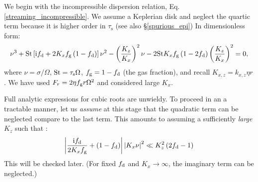 We begin with the incompressible dispersion
relation, Eq. \ref{streaming_incompressible}. We assume a Keplerian
disk and neglect the quartic  
term because it is higher order in $\tau_\mathrm{s}$ (see also
\S\ref{spurious_epi})  In dimensionless form: 
\begin{align}
  \nu^3 + \mathrm{St}\left[\mathrm{i}f_\mathrm{d} + 2 K_x f_\mathrm{g} \left(1-f_\mathrm{d}\right)\right]\nu^2
  - \left(\frac{K_z}{K_x}\right)^2\nu - 2\mathrm{St} K_x f_\mathrm{g}
  \left(1-2f_\mathrm{d}\right)\left(\frac{K_z}{K_x}\right)^2 = 0,\label{dimless_cubic}
\end{align}
where $\nu = \sigma/\Omega$, $\mathrm{St} = \tau_\mathrm{s}\Omega$, $f_\mathrm{g} = 1-f_\mathrm{d}$ (the gas
fraction), and recall $K_{x,z}=k_{x,z}\eta r$. We have used $F_r =
2\eta f_\mathrm{g} r \Omega^2$ and considered large $K_x$. 

Full analytic expressions for cubic roots are unwieldy. To proceed
in an a tractable manner, let us \emph{assume} at this stage that the
quadratic term can be neglected compare to the last term. This amounts
to assuming a  sufficiently \emph{large} $K_z$ such that :
\begin{align}
\left|\frac{\mathrm{i}f_\mathrm{d}}{2K_xf_\mathrm{g}} + \left(1 -
      f_\mathrm{d}\right)\right| \left|K_x\nu\right|^2 \ll
  K_z^2\left(2f_\mathrm{d} - 1\right) \label{min_kz}
\end{align}
This will be checked later. (For fixed $f_\mathrm{d}$ and $K_x\to\infty$, the
imaginary term can be neglected.)


